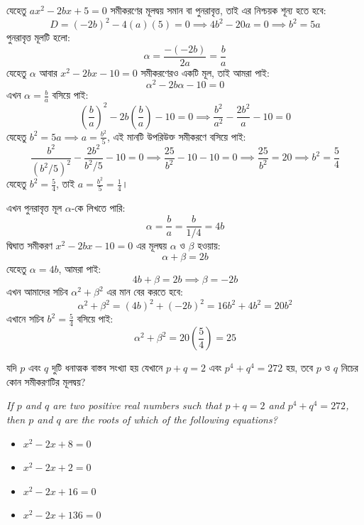 \documentclass[12pt, a4paper]{article}
\begin{document}
\begin{tcolorbox}[solutionbox={সমাধান (Solution)}]
    \noindent
    যেহেতু $ax^2 - 2bx + 5 = 0$ সমীকরণের মূলদ্বয় সমান বা পুনরাবৃত্ত, তাই এর নিশ্চয়ক শূন্য হতে হবে:
    \[ D = (-2b)^2 - 4(a)(5) = 0 \implies 4b^2 - 20a = 0 \implies b^2 = 5a \]
    পুনরাবৃত্ত মূলটি হলো:
    \[ \alpha = \frac{-(-2b)}{2a} = \frac{b}{a} \]
    যেহেতু $\alpha$ আবার $x^2 - 2bx - 10 = 0$ সমীকরণেরও একটি মূল, তাই আমরা পাই:
    \[ \alpha^2 - 2b\alpha - 10 = 0 \]
    এখন $\alpha = \frac{b}{a}$ বসিয়ে পাই:
    \[ \left(\frac{b}{a}\right)^2 - 2b\left(\frac{b}{a}\right) - 10 = 0 \implies \frac{b^2}{a^2} - \frac{2b^2}{a} - 10 = 0 \]
    যেহেতু $b^2 = 5a \implies a = \frac{b^2}{5}$, এই মানটি উপরিউক্ত সমীকরণে বসিয়ে পাই:
    \[ \frac{b^2}{(b^2/5)^2} - \frac{2b^2}{b^2/5} - 10 = 0 \implies \frac{25}{b^2} - 10 - 10 = 0 \implies \frac{25}{b^2} = 20 \implies b^2 = \frac{5}{4} \]
    যেহেতু $b^2 = \frac{5}{4}$, তাই $a = \frac{b^2}{5} = \frac{1}{4}$।
    
    এখন পুনরাবৃত্ত মূল $\alpha$-কে লিখতে পারি:
    \[ \alpha = \frac{b}{a} = \frac{b}{1/4} = 4b \]
    দ্বিঘাত সমীকরণ $x^2 - 2bx - 10 = 0$ এর মূলদ্বয় $\alpha$ ও $\beta$ হওয়ায়:
    \[ \alpha + \beta = 2b \]
    যেহেতু $\alpha = 4b$, আমরা পাই:
    \[ 4b + \beta = 2b \implies \beta = -2b \]
    এখন আমাদের সচিব $\alpha^2 + \beta^2$ এর মান বের করতে হবে:
    \[ \alpha^2 + \beta^2 = (4b)^2 + (-2b)^2 = 16b^2 + 4b^2 = 20b^2 \]
    এখানে সচিব $b^2 = \frac{5}{4}$ বসিয়ে পাই:
    \[ \alpha^2 + \beta^2 = 20 \left(\frac{5}{4}\right) = 25 \]
\end{tcolorbox}
\begin{tcolorbox}[questionbox={প্রশ্ন (Question) 38}]
    \noindent
    যদি $p$ এবং $q$ দুটি ধনাত্মক বাস্তব সংখ্যা হয় যেখানে $p+q = 2$ এবং $p^4 + q^4 = 272$ হয়, তবে $p$ ও $q$ নিচের কোন সমীকরণটির মূলদ্বয়?
    
    \vspace{0.8em}
    \begin{english}
    \noindent\textit{\color{darkgray}
    If $p$ and $q$ are two positive real numbers such that $p+q = 2$ and $p^4 + q^4 = 272$, then $p$ and $q$ are the roots of which of the following equations?
    }
    \end{english}
\end{tcolorbox}

\begin{itemize}[label={}, leftmargin=1cm, itemsep=0.5em]
    \item[\textbf{A)}] $x^2 - 2x + 8 = 0$
    \item[\textbf{B)}] $x^2 - 2x + 2 = 0$
    \item[\textbf{C)}] $x^2 - 2x + 16 = 0$
    \item[\textbf{D)}] $x^2 - 2x + 136 = 0$
\end{itemize}
\end{document}
